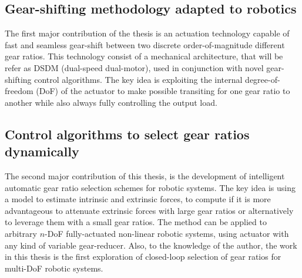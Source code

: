 
\subsection{Gear-shifting methodology adapted to robotics}

The first major contribution of the thesis is an actuation technology capable of fast and seamless gear-shift between two discrete order-of-magnitude different gear ratios. This technology consist of a mechanical architecture, that will be refer as DSDM (dual-speed dual-motor), used in conjunction with novel gear-shifting control algorithms. The key idea is exploiting the internal degree-of-freedom (DoF) of the actuator to make possible transiting for one gear ratio to another while also always fully controlling the output load. 

\subsection{Control algorithms to select gear ratios dynamically}

The second major contribution of this thesis, is the development of intelligent automatic gear ratio selection schemes for robotic systems. The key idea is using a model to estimate intrinsic and extrinsic forces, to compute if it is more advantageous to attenuate extrinsic forces with large gear ratios or alternatively to leverage them with a small gear ratios. The method can be applied to arbitrary $n$-DoF fully-actuated non-linear robotic systems, using actuator with any kind of variable gear-reducer. Also, to the knowledge of the author, the work in this thesis is the first exploration of closed-loop selection of gear ratios for multi-DoF robotic systems.




